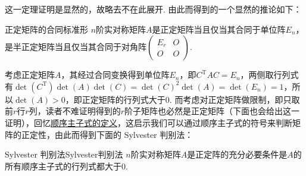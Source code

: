 这一定理证明是显然的，故略去不在此展开. 由此而得到的一个显然的推论如下：

\begin{corollary}{}{正定矩阵的合同标准形}
    $n$阶实对称矩阵$A$是正定矩阵当且仅当其合同于单位阵$E_n$，是半正定矩阵当且仅当其合同于对角阵$\begin{pmatrix}
        E_r & O \\ O & O
    \end{pmatrix}$.
\end{corollary}

考虑正定矩阵$A$，其经过合同变换得到单位阵$E_n$，即$C^\mathrm{T}AC = E_n$，两侧取行列式有$\det(C^\mathrm{T})\det(A)\det(C)=\det(C)^2\det(A)=\det(E_n)=1$，所以$\det(A)>0$，即正定矩阵的行列式大于$0$. 而考虑对正定矩阵做限制，即只取前$r$行$r$列，读者不难证明得到的$r$阶子矩阵也必然是正定矩阵（下面也会给出这一证明），回忆\hyperref[def:子式、主子式、顺序主子式]{顺序主子式的定义}，这启示我们可以通过顺序主子式的符号来判断矩阵的正定性，由此而得到下面的 Sylvester 判别法：

\begin{theorem}{Sylvester 判别法}{Sylvester判别法}
    $n$阶实对称矩阵$A$是正定阵的充分必要条件是$A$的所有顺序主子式的行列式都大于$0$.
\end{theorem}

